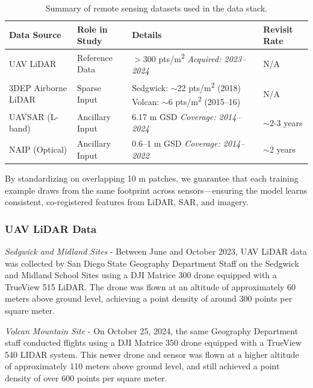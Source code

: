 \documentclass[preprints,article,accept,pdftex,moreauthors]{Definitions/mdpi}
\begin{document}
\begin{table}[H] %
\centering
\caption{Summary of remote sensing datasets used in the data stack.}
\label{tab:data_summary}
\begin{tabular}{l l p{4.5cm} l}
\toprule
\textbf{Data Source} & \textbf{Role in Study} & \textbf{Details} & \textbf{Revisit Rate} \\
\midrule
UAV LiDAR & Reference Data & $>$300 pts/m\textsuperscript{2} \newline \textit{Acquired: 2023--2024} & N/A \\
\addlinespace %
3DEP Airborne LiDAR & Sparse Input & Sedgwick: $\sim$22 pts/m\textsuperscript{2} (2018) \newline Volcan: $\sim$6 pts/m\textsuperscript{2} (2015–16) & N/A \\
\addlinespace
UAVSAR (L-band) & Ancillary Input & 6.17 m GSD \newline \textit{Coverage: 2014--2024} & $\sim$2-3 years \\
\addlinespace
NAIP (Optical) & Ancillary Input & 0.6–1 m GSD \newline \textit{Coverage: 2014--2022} & $\sim$2 years \\
\bottomrule
\end{tabular}
\end{table}

By standardizing on overlapping 10 m patches, we guarantee that each training example draws from the same footprint across sensors—ensuring the model learns consistent, co-registered features from LiDAR, SAR, and imagery.

\subsubsection{UAV LiDAR Data}
\textit{Sedgwick and Midland Sites} - Between June and October 2023, UAV LiDAR data was collected by San Diego State Geography Department Staff on the Sedgwick and Midland School Sites using a DJI Matrice 300 drone equipped with a TrueView 515 LiDAR. The drone was flown at an altitude of approximately 60 meters above ground level, achieving a point density of around 300 points per square meter. 

\textit{Volcan Mountain Site} - On October 25, 2024, the same Geography Department staff conducted flights using a  DJI Matrice 350 drone equipped with a TrueView 540 LIDAR system. This newer drone and sensor was flown at a higher altitude of approximately 110 meters above ground level, and still achieved a point density of over 600 points per square meter.
\end{document}
